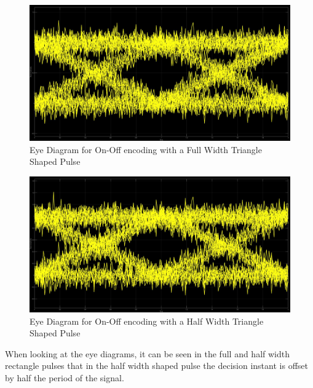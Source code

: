 \documentclass{article}
\begin{document}
\begin{figure}[H]
  \includegraphics[width = \linewidth]{OO_Tri_F_Eye.jpg}
  \caption{Eye Diagram for On-Off encoding with a Full Width Triangle Shaped Pulse}
  \label{fig:OO-Tri-F-Eye}
\end{figure}
\begin{figure}[H]
  \includegraphics[width = \linewidth]{OO_Tri_H_Eye.jpg}
  \caption{Eye Diagram for On-Off encoding with a Half Width Triangle Shaped Pulse}
  \label{fig:OO-Tri-H-Eye}
\end{figure}
When looking at the eye diagrams, it can be seen in the full and half width rectangle pulses that in the half width shaped pulse the decision instant is offset by half the period of the signal.
\end{document}
